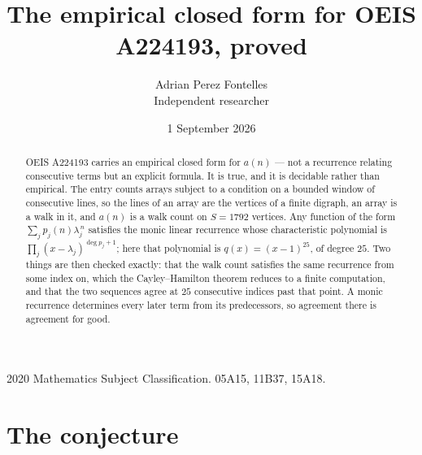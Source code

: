 \documentclass[11pt,a4paper]{article}
\title{The empirical closed form for OEIS A224193, proved}
\author{Adrian Perez Fontelles\\ \small Independent researcher}
\date{1 September 2026}
\theoremstyle{plain}
\theoremstyle{definition}
\begin{document}
\maketitle

\begin{abstract}
OEIS A224193 carries an empirical closed form for $a(n)$ --- not a recurrence relating
consecutive terms but an explicit formula. It is true, and it is decidable rather than
empirical. The entry counts arrays subject to a condition on a bounded window of consecutive lines, so the lines of an array are the
vertices of a finite digraph, an array is a walk in it, and $a(n)$ is a walk count on
$S=1792$ vertices. Any function of the form $\sum_j p_j(n)\lambda_j^{\,n}$ satisfies the
monic linear recurrence whose characteristic polynomial is
$\prod_j(x-\lambda_j)^{\deg p_j+1}$; here that polynomial is $q(x)=(x-1)^{25}$, of degree
$25$. Two things are then checked exactly: that the walk count satisfies the same
recurrence from some index on, which the Cayley--Hamilton theorem reduces to a finite
computation, and that the two sequences agree at $25$ consecutive indices past that
point. A monic recurrence determines every later term from its predecessors, so agreement
there is agreement for good.
\end{abstract}

\noindent\small 2020 Mathematics Subject Classification. 05A15, 11B37, 15A18.\normalsize

\section{The conjecture}
\end{document}
